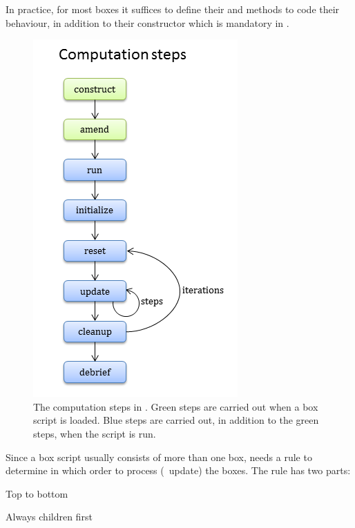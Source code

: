 In practice, for most boxes it suffices to define their  and  methods to code their behaviour, in addition to their constructor which is mandatory in \CPP.
 
\begin{figure}
\centering
\includegraphics[scale=0.8]{graphics/computation-steps}
\caption{The computation steps in \US. Green steps are carried out when a box script is loaded. Blue steps are carried out, in addition to the green steps, when the script is run.}
\label{fig:computation-steps}
\end{figure}

Since a box script usually consists of more than one box,  needs a rule to determine in which order to process (\eg\ update) the boxes. The rule has two parts:
\medskip
\begin{compactenum}
\item Top to bottom
\item Always children first
\end{compactenum}
\medskip

